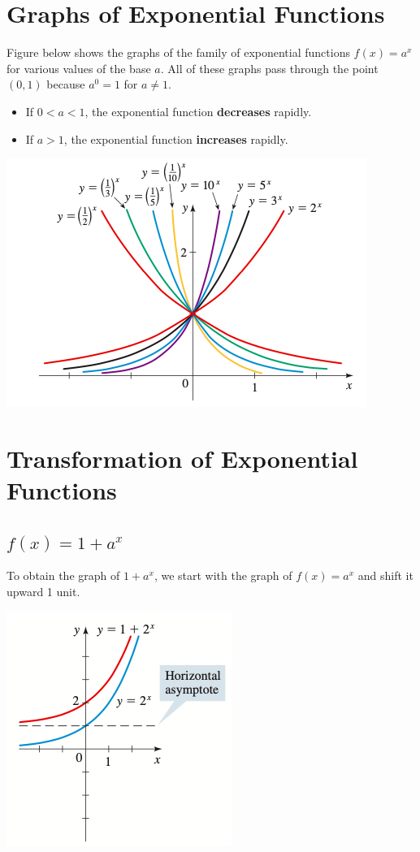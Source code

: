 \documentclass{book}
\begin{document}
	\section{Graphs of Exponential Functions}
	 Figure below shows the graphs of the family of exponential functions $f(x) = a^x$ for various values of the base $a$. All of these graphs pass through the point $(0,1)$ because $a^0 = 1$ for $a \neq 1$.
	 
	 \begin{itemize}
	 	\item If $0<a<1$, the exponential function \textbf{decreases} rapidly.
	 	\item If $a>1$, the exponential function \textbf{increases} rapidly.
	 \end{itemize}
	 
	 \includegraphics[scale=1.0]{expgraph}
	
	\section{Transformation of Exponential Functions}
	 \subsection{$f(x)=1+a^x$}
	 To obtain the graph of $1+a^x$, we start with the graph of $f(x) = a^x$ and shift it upward 1 unit.
	 
	 \includegraphics[scale=0.8]{exp1}
	 
\end{document}
